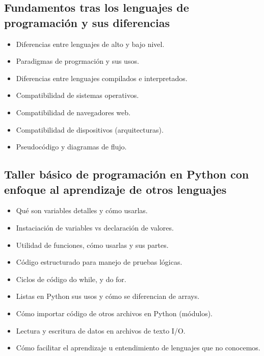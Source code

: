﻿\documentclass[letterpaper]{article}
\begin{document}
\subsection{Fundamentos tras los lenguajes de programación y sus diferencias}
\begin{itemize}
    \item Diferencias entre lenguajes de alto y bajo nivel.
    \item Paradigmas de progrmación y sus usos.
    \item Diferencias entre lenguajes compilados e interpretados.
    \item Compatibilidad de sistemas operativos.
    \item Compatibilidad de navegadores web.
    \item Compatibilidad de dispositivos (arquitecturas).
    \item Pseudocódigo y diagramas de flujo.
\end{itemize}
\subsection{Taller básico de programación en Python con enfoque al aprendizaje de otros lenguajes}
\begin{itemize}
    \item Qué son variables detalles y cómo usarlas.
    \item Instaciación de variables vs declaración de valores.
    \item Utilidad de funciones, cómo usarlas y sus partes.
    \item Código estructurado para manejo de pruebas lógicas.
    \item Ciclos de código do while, y do for.
    \item Listas en Python sus usos y cómo se diferencian de arrays.
    \item Cómo importar código de otros archivos en Python (módulos).
    \item Lectura y escritura de datos en archivos de texto I/O.
    \item Cómo facilitar el aprendizaje u entendimiento de lenguajes que no conocemos.
\end{itemize}
\end{document}
